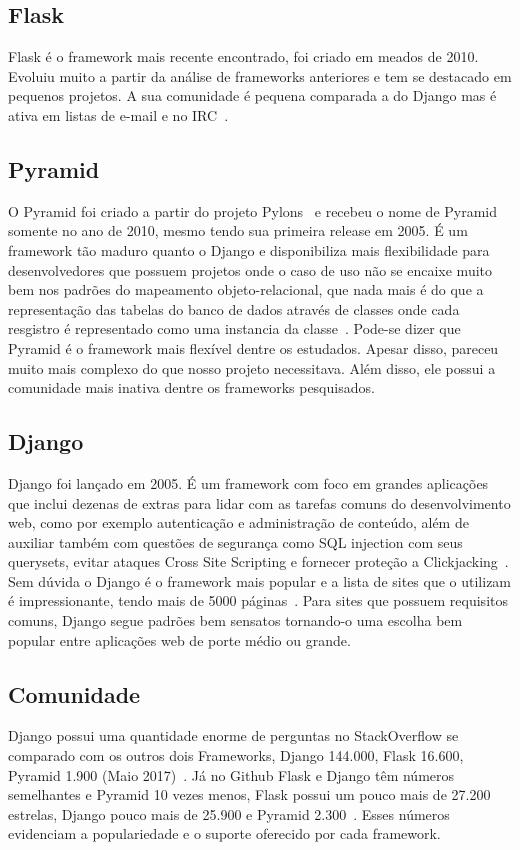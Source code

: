 \documentclass[a4paper, 12pt, oneside]{book}
\begin{document}
\subsection{Flask}
Flask é o framework mais recente encontrado, foi criado em meados de 2010. Evoluiu muito a partir da análise de frameworks anteriores e tem se destacado em pequenos projetos. A sua comunidade é pequena comparada a do Django mas é ativa em listas de e-mail e no IRC~\cite{ryanbrown}. 

\subsection{Pyramid}
O Pyramid foi criado a partir do projeto Pylons~\cite{pylonsproject} e recebeu o nome de Pyramid somente no ano de 2010, mesmo tendo sua primeira release em 2005. É um framework tão maduro quanto o Django e disponibiliza mais flexibilidade para desenvolvedores que possuem projetos onde o caso de uso não se encaixe muito bem nos padrões do mapeamento objeto-relacional, que nada mais é do que a representação das tabelas do banco de dados através de classes onde cada resgistro é representado como uma instancia da classe~\cite{pyramid}. Pode-se dizer que Pyramid é o framework mais flexível dentre os estudados. Apesar disso, pareceu muito mais complexo do que nosso projeto necessitava. Além disso, ele possui a comunidade mais inativa dentre os frameworks pesquisados.

\subsection{Django}
Django foi lançado em 2005. É um framework com foco em grandes aplicações que inclui dezenas de extras para lidar com as tarefas comuns do desenvolvimento web, como por exemplo autenticação e administração de conteúdo, além de auxiliar também com questões de segurança como SQL injection com seus querysets, evitar ataques Cross Site Scripting e fornecer proteção a Clickjacking~\cite{django}. Sem dúvida o Django é o framework mais popular e a lista de sites que o utilizam é impressionante, tendo mais de 5000 páginas~\cite{listadjangosites}. Para sites que possuem requisitos comuns, Django segue padrões bem sensatos tornando-o uma escolha bem popular entre aplicações web de porte médio ou grande.

\subsection{Comunidade}
Django possui uma quantidade enorme de perguntas no StackOverflow se comparado com os outros dois Frameworks, Django 144.000, Flask 16.600, Pyramid 1.900 (Maio 2017)~\cite{stackoverflowtags}. Já no Github Flask e Django têm números semelhantes e Pyramid 10 vezes menos, Flask possui um pouco mais de 27.200 estrelas, Django pouco mais de 25.900 e Pyramid 2.300~\cite{github}. Esses números evidenciam a populariedade e o suporte oferecido por cada framework.
\end{document}
